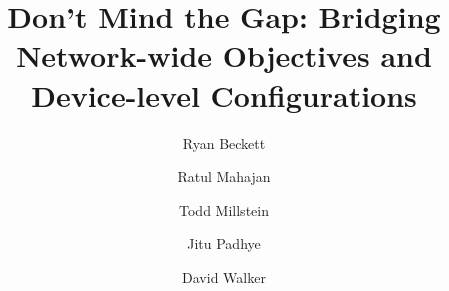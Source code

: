 \documentclass[10pt]{sigalternate052015}
\begin{document}



\setlength{\pdfpageheight}{\paperheight}
\setlength{\pdfpagewidth}{\paperwidth}

\title{Don't Mind the Gap:  Bridging Network-wide Objectives and Device-level Configurations}



\author{%
Ryan Beckett\\
\and
Ratul Mahajan\\
\and
Todd Millstein\\
\and
Jitu Padhye\\
\and
David Walker\\
}

\maketitle



%
%
%
%
\end{document}
